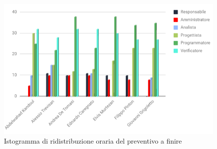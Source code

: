 \begin{figure}[h!]
	\caption{Istogramma di ridistribuzione oraria del preventivo a finire}
    \includegraphics[width=1\textwidth]{./src/Preventivo/src/img/IstoPreventivoaFinireProj.png}  
\end{figure} 

